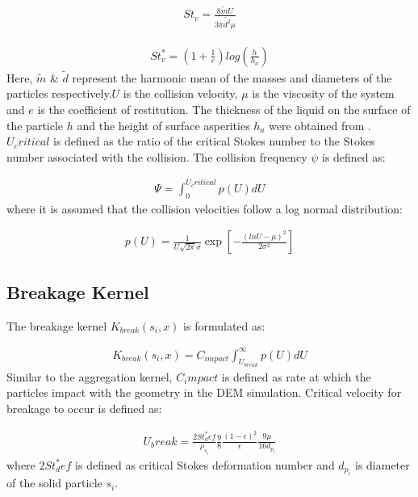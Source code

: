 \documentclass[preprint,10pt,authoryear,review]{elsarticle}
\begin{document}
\begin{align}
St_v=\frac{8\tilde{m}U}{3\pi\tilde{d^2}\mu}
\label{eqn:mthds_pbm_agg_Stnum}
\end{align}

\begin{align}
St^*_v=\left(1+\frac{1}{e}\right)log\left(\frac{h}{h_a}\right)
\label{eqn:mthds_pbm_agg_cricSt}
\end{align}
Here, $\tilde{m}$ \& $\tilde{d}$ represent the harmonic mean of the masses and 
diameters of the particles respectively.$U$ is the collision velocity, $\mu$ is the 
viscosity of the system and $e$ is the coefficient of restitution. The thickness of 
the liquid on the surface of the particle $h$ and the height of surface asperities 
$h_a$ were obtained from \citep{Barrasso2015ces}. $U_critical$ is defined as the 
ratio of the critical Stokes number to the Stokes number associated with the collision. 
The collision frequency $\psi$ is defined as:

\begin{align}
\Psi = \int_0^{U_critical} p(U)dU
\label{eqn:mthds_pbm_agg_psi}
\end{align}
where it is assumed that the collision velocities follow a log normal distribution:


\begin{align}
p(U) = \frac{1}{U\sqrt{2\pi}\sigma}\exp\left[-\frac{(lnU-\mu)^2}{2\sigma^2}\right]
\label{eqn:mthds_pbm_agg_lognormVelo}
\end{align}



\subsection{Breakage Kernel}
\label{app:breakKernel}
The breakage kernel $K_{break}(s_i,x)$ is formulated as: 

\begin{align}
K_{break}(s_i,x) = C_{impact}\int_{U_{break}}^{\infty}p(U)dU
\label{eqn:mthds_pbm_breakage_kernel}
\end{align}
Similar to the aggregation kernel, $C_impact$ is defined as rate at which 
the particles impact with the geometry in the DEM simulation. Critical velocity 
for breakage to occur is defined as:

\begin{align}
U_break=\frac{2St^*_def}{\rho_{s_i}}\frac{9}{8}\frac{(1-\epsilon)^2}{\epsilon}\frac{9\mu}{16d_{p_i}}
\label{eqn:mthds_pbm_breakage_ubreak}
\end{align}
where $2St^*_def$ is defined as critical Stokes deformation number \citep{Iveson2001} and 
$d_{p_i}$ is diameter of the solid particle $s_i$.






\end{document}
